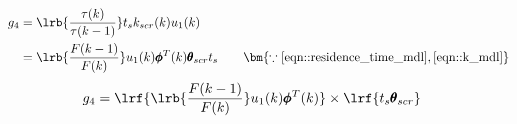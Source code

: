\begin{align*}
        g_4 &= \lrb{\frac{\tau(k)}{\tau(k-1)}}
                t_s k_{scr}(k) u_1(k)\\
                &= \lrb{\frac{F(k-1)}{F(k)}} u_1(k) \pmb \phi^T(k) \pmb \theta_{scr} t_s
                \qquad \bm{\because \ref{eqn::residence_time_mdl}, \ref{eqn::k_mdl}}
\end{align*}
\begin{align}
        g_4 &= \lrf{\lrb{\frac{F(k-1)}{F(k)}} u_1(k) \pmb \phi^T(k)}
                \times \lrf{ t_s \pmb \theta_{scr} }
\end{align}
